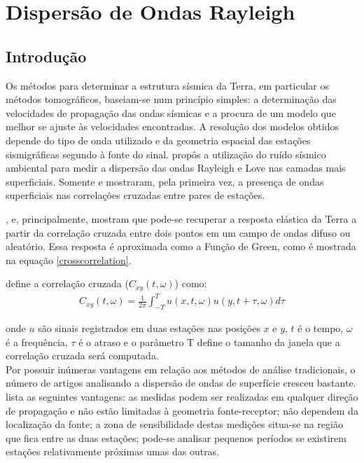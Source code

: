 \chapter{Dispersão de Ondas Rayleigh}

\section{Introdução}

Os métodos para determinar a estrutura sísmica da Terra, em particular os métodos tomográficos, baseiam-se num princípio simples: a determinação das velocidades de propagação das ondas sísmicas e a procura de um modelo que melhor se ajuste às velocidades encontradas. A resolução dos modelos obtidos depende do tipo de onda utilizado e da geometria espacial das estações sismigráficas segundo à fonte do sinal. \cite{aki_space_1957} propôs a utilização do ruído sísmico ambiental para medir a dispersão das ondas Rayleigh e Love nas camadas mais superficiais. Somente \cite{campillo_long-range_2003}  e \cite{shapiro_emergence_2004} mostraram, pela primeira vez, a  presença de ondas superficiais nas correlações cruzadas entre pares de estações.

\cite{campillo_long-range_2003}, \cite{shapiro_emergence_2004} e, principalmente, \cite{wapenaar_retrieving_2004} mostram que pode-se recuperar a resposta elástica da Terra a partir da correlação cruzada entre dois pontos em  um campo de ondas difuso ou aleatório. Essa resposta é aproximada como a Função de Green, como é mostrada na equação \ref{crosscorrelation}. 

\cite{boschi_measuring_2013} define a correlação cruzada ($C_{xy}(t,\omega)$) como: 
\begin{eqnarray}
\label{crosscorrelation}
C_{xy}(t,\omega) = \frac{1}{2\pi}\int_{-T}^{T}u(x,t,\omega)u(y,t+\tau,\omega) d\tau
\end{eqnarray}

onde $u$ são sinais registrados em duas estações nas posições $x$ e $y$, $t$ é o tempo, $\omega$ é a frequência, $\tau$ é o atraso e o parâmetro T define o tamanho da janela que a correlação cruzada será computada.
\\

Por possuir inúmeras vantagens em relação aos métodos de análise tradicionais, o número de artigos analisando a dispersão de ondas de superfície cresceu bastante. \cite{shapiro_emergence_2004} lista as seguintes vantagens: as medidas podem ser realizadas em qualquer direção de propagação e não estão limitadas à geometria fonte-receptor; não dependem da localização da fonte; a zona de sensibilidade destas medições situa-se na região que fica entre as duas estações; pode-se analisar pequenos períodos se existirem estações relativamente próximas umas das outras.

